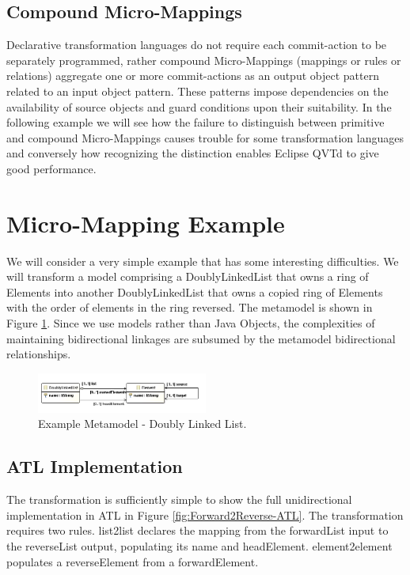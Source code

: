 \documentclass[conference]{IEEEtran}
\begin{document}
\subsection{Compound Micro-Mappings}

Declarative transformation languages do not require each commit-action to be separately programmed, rather compound Micro-Mappings (mappings or rules or relations) aggregate one or more commit-actions as an output object pattern related to an input object pattern. These patterns impose dependencies on the availability of source objects and guard conditions upon their suitability. In the following example we will see how the failure to distinguish between primitive and compound Micro-Mappings causes trouble for some transformation languages and conversely how recognizing the distinction enables Eclipse QVTd to give good performance.

\section{Micro-Mapping Example}\label{Micro-Mapping Example}

We will consider a very simple example that has some interesting difficulties. We will transform a model comprising a DoublyLinkedList that owns a ring of Elements into another DoublyLinkedList that owns a copied ring of Elements with the order of elements in the ring reversed. The metamodel is shown in Figure \ref{fig:DoublyLinkedListMM}. Since we use models rather than Java Objects, the complexities of maintaining bidirectional linkages are subsumed by the metamodel bidirectional relationships.

\begin{figure}[h]
	\centering
	\includegraphics[width=0.5\textwidth]{doublylinkedlist.png}
	\caption{Example Metamodel - Doubly Linked List.}
	\label{fig:DoublyLinkedListMM}
\end{figure}

\subsection{ATL Implementation}

The transformation is sufficiently simple to show the full unidirectional implementation in ATL in Figure \ref{fig:Forward2Reverse-ATL}. The transformation requires two rules. list2list declares the mapping from the forwardList input to the reverseList output, populating its name and headElement. element2element populates a reverseElement from a forwardElement.
\end{document}
